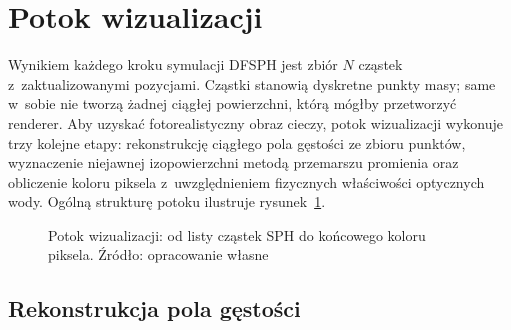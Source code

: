 
\section{Potok wizualizacji}
\label{sec:visualization_pipeline_theory}

Wynikiem każdego kroku symulacji DFSPH jest zbiór $N$ cząstek z~zaktualizowanymi
pozycjami. Cząstki stanowią dyskretne punkty masy; same w~sobie nie tworzą
żadnej ciągłej powierzchni, którą mógłby przetworzyć renderer. Aby uzyskać
fotorealistyczny obraz cieczy, potok wizualizacji wykonuje trzy kolejne etapy:
rekonstrukcję ciągłego pola gęstości ze zbioru punktów, wyznaczenie niejawnej
izopowierzchni metodą przemarszu promienia oraz obliczenie koloru piksela z~uwzględnieniem
fizycznych właściwości optycznych wody. Ogólną strukturę potoku ilustruje
rysunek~\ref{fig:vis_pipeline}.

\begin{figure}[ht]
\centering
{}
\caption{Potok wizualizacji: od listy cząstek SPH do końcowego koloru piksela. Źródło: opracowanie własne}
\label{fig:vis_pipeline}
\end{figure}

\subsection{Rekonstrukcja pola gęstości}

